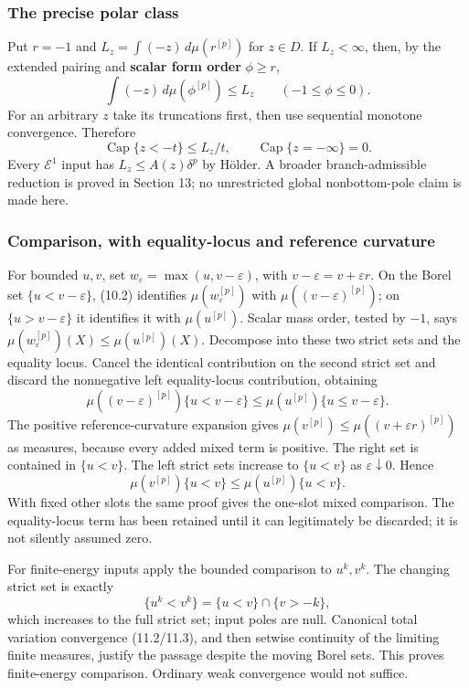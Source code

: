 \documentclass[
]{article}
\begin{document}
\subsubsection{The precise polar class}\label{the-precise-polar-class}

Put \(r=-1\) and \(L_z=\int(-z)\,d\mu(r^{[p]})\) for \(z\in D\). If
\(L_z<\infty\), then, by the extended pairing and \textbf{scalar form
order} \(\phi\ge r\),
\[\int(-z)\,d\mu(\phi^{[p]})\le L_z\qquad(-1\le\phi\le0).\] For an
arbitrary \(z\) take its truncations first, then use sequential monotone
convergence. Therefore
\[\operatorname{Cap}\{z<-t\}\le L_z/t,\qquad \operatorname{Cap}\{z=-\infty\}=0.\tag{12.2}\]
Every \(\mathcal E^1\) input has \(L_z\le A(z)\delta^p\) by Hölder. A
broader branch-admissible reduction is proved in Section 13; no
unrestricted global nonbottom-pole claim is made here.

\subsubsection{Comparison, with equality-locus and reference
curvature}\label{comparison-with-equality-locus-and-reference-curvature}

For bounded \(u,v\), set \(w_\varepsilon=\max(u,v-\varepsilon)\), with
\(v-\varepsilon=v+\varepsilon r\). On the Borel set
\(\{u<v-\varepsilon\}\), (10.2) identifies \(\mu(w_\varepsilon^{[p]})\)
with \(\mu((v-\varepsilon)^{[p]})\); on \(\{u>v-\varepsilon\}\) it
identifies it with \(\mu(u^{[p]})\). Scalar mass order, tested by
\(-1\), says \(\mu(w_\varepsilon^{[p]})(X)\le\mu(u^{[p]})(X)\).
Decompose into these two strict sets and the equality locus. Cancel the
identical contribution on the second strict set and discard the
nonnegative left equality-locus contribution, obtaining
\[\mu((v-\varepsilon)^{[p]})\{u<v-\varepsilon\}\le\mu(u^{[p]})\{u\le v-\varepsilon\}.\]
The positive reference-curvature expansion gives
\(\mu(v^{[p]})\le\mu((v+\varepsilon r)^{[p]})\) as measures, because
every added mixed term is positive. The right set is contained in
\(\{u<v\}\). The left strict sets increase to \(\{u<v\}\) as
\(\varepsilon\downarrow0\). Hence
\[\mu(v^{[p]})\{u<v\}\le\mu(u^{[p]})\{u<v\}.\tag{12.3}\] With fixed
other slots the same proof gives the one-slot mixed comparison. The
equality-locus term has been retained until it can legitimately be
discarded; it is not silently assumed zero.

For finite-energy inputs apply the bounded comparison to \(u^k,v^k\).
The changing strict set is exactly \[\{u^k<v^k\}=\{u<v\}\cap\{v>-k\},\]
which increases to the full strict set; input poles are null. Canonical
total variation convergence (11.2/11.3), and then setwise continuity of
the limiting finite measures, justify the passage despite the moving
Borel sets. This proves finite-energy comparison. Ordinary weak
convergence would not suffice.
\end{document}

